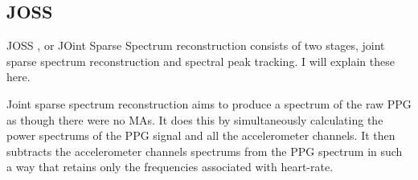 \documentclass[12pt,a4paper,twoside,openany]{report}
\begin{document}
%
%
%
%
%

\subsection{JOSS} \label{joss-intro}

JOSS \cite{Zhang15.2}, or JOint Sparse Spectrum reconstruction consists of two
stages, joint sparse spectrum reconstruction and spectral peak tracking. I
will explain these here.

Joint sparse spectrum reconstruction aims to produce a spectrum of the raw PPG
as though there were no MAs. It does this by simultaneously calculating the
power spectrums of the PPG signal and all the accelerometer channels. It then
subtracts the accelerometer channels spectrums from the PPG spectrum in such a
way that retains only the frequencies associated with heart-rate.
\end{document}
